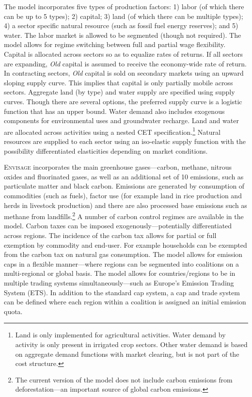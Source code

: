 \documentclass[11pt,letterpaper]{report}
\begin{document}
The model incorporates five types of production factors: 1) labor (of which
there can be up to 5 types); 2) capital; 3) land (of which there
can be multiple types); 4) a sector specific natural
resource (such as fossil fuel energy reserves); and 5) water. The labor market
is allowed to be segmented (though not required). The model allows for regime
switching between full and partial wage flexibility. Capital is allocated across
sectors so as to equalize rates of returns. If all sectors are expanding,
\emph{Old} capital is assumed to receive the economy-wide rate of return. In
contracting sectors, \emph{Old} capital is sold on secondary markets using an
upward sloping supply curve. This implies that capital is only partially mobile
across sectors. Aggregate land (by type) and water supply are specified using supply
curves. Though there are several options, the preferred supply curve is a
logistic function that has an upper bound. Water demand also includes exogenous
components for environmental uses and groundwater recharge. Land and water are
allocated across activities using a nested CET specification.\footnote{Land is
only implemented for agricultural activities. Water demand by activity is only
present in irrigated crop sectors. Other water demand is based on aggregate
demand functions with market clearing, but is not part of the cost structure.}
Natural resources are supplied to each sector using an iso-elastic supply
function with the possibility differentiated elasticities depending on market
conditions.

\textsc{Envisage} incorporates the main greenhouse gases---carbon, methane,
nitrous oxides and fluorinated gases, as well as an additional set of
10 emissions, such as particulate matter and black carbon.
Emissions are generated by consumption of
commodities (such as fuels), factor use (for example land in rice production and
herds in livestock production) and there are also processed base emissions such
as methane from landfills.\footnote{The current version of the model does not
include carbon emissions from deforestation---an important source of global
carbon emissions.} A number of carbon control regimes are available in the
model. Carbon taxes can be imposed exogenously---potentially differentiated
across regions. The incidence of the carbon tax allows for partial or full
exemption by commodity and end-user. For example households can be exempted from
the carbon tax on natural gas consumption. The model allows for emission caps in
a flexible manner---where regions can be segmented into coalitions on a
multi-regional or global basis. The model allows for
countries/regions to be in multiple trading systems simultaneously---such
as Europe's Emission Trading System (ETS). In addition to the standard cap system, a cap
and trade system can be defined where each region within a coalition is assigned
an initial emission quota.
\end{document}
